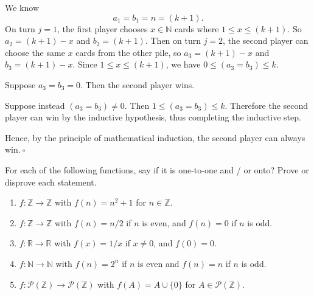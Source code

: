 \documentclass{article}
\newcommand{\Z}{\mathbb{Z}}
\newcommand{\N}{\mathbb{N}}
\newcommand{\R}{\mathbb{R}}
\theoremstyle{definition}
\begin{document}
\begin{solution}
\begin{description}
We know
\[a_1=b_1=n=(k+1).\]
On turn $j=1$, the first player chooses $x\in\mathbb{N}$ cards where $1\leq x\leq (k+1)$. So $a_2=(k+1)-x$ and $b_2=(k+1)$. Then on turn $j=2$, the second player can choose the same $x$ cards from the other pile, so $a_3=(k+1)-x$ and $b_3=(k+1)-x$. Since $1\leq x\leq(k+1)$, we have $0\leq (a_3=b_3)\leq k$.

Suppose $a_3=b_3=0$. Then the second player wins.

Suppose instead $(a_3=b_3)\neq 0$. Then $1\leq(a_3=b_3)\leq k$. Therefore the second player can win by the inductive hypothesis, thus completing the inductive step.
\end{description}
Hence, by the principle of mathematical induction, the second player can always win.$~\square$
\end{solution}
\begin{question}
    For each of the following functions, say if it is one-to-one and / or onto? Prove or disprove each statement.
    \begin{enumerate}
	\item $f : \Z \to \Z$ with $f(n) = n^2 + 1$ for $n \in \Z$.
	\item $f : \Z \to \Z$ with $f(n) = n/2$ if $n$ is even, and $f(n) = 0$ if $n$ is odd.
	\item $f : \R \to \R$ with $f(x) = 1/x$ if $x \neq 0$, and $f(0) = 0$.
	\item $f: \N \to \N$ with $f(n) = 2^n$ if $n$ is even and $f(n) = n$ if $n$ is odd.
	\item $f : \mathcal{P}(\Z) \to \mathcal{P}(\Z)$ with $f(A) = A \cup \{ 0 \}$ for $A \in \mathcal{P}(\Z)$.
    \end{enumerate}
\end{question}
\end{document}

